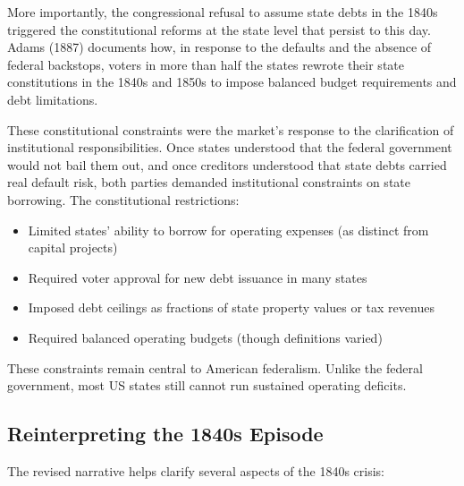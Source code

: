 \documentclass[12pt]{article}
\begin{document}
More importantly, the congressional refusal to assume state debts in the 1840s triggered the constitutional reforms at the state level that persist to this day. Adams (1887) documents how, in response to the defaults and the absence of federal backstops, voters in more than half the states rewrote their state constitutions in the 1840s and 1850s to impose balanced budget requirements and debt limitations.

These constitutional constraints were the market's response to the clarification of institutional responsibilities. Once states understood that the federal government would not bail them out, and once creditors understood that state debts carried real default risk, both parties demanded institutional constraints on state borrowing. The constitutional restrictions:

\begin{itemize}
\item Limited states' ability to borrow for operating expenses (as distinct from capital projects)
\item Required voter approval for new debt issuance in many states
\item Imposed debt ceilings as fractions of state property values or tax revenues
\item Required balanced operating budgets (though definitions varied)
\end{itemize}

These constraints remain central to American federalism. Unlike the federal government, most US states still cannot run sustained operating deficits.

\subsection{Reinterpreting the 1840s Episode}

The revised narrative helps clarify several aspects of the 1840s crisis:
\end{document}
